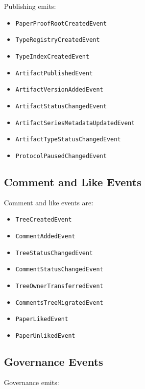\documentclass[11pt]{article}
\newcommand{\code}[1]{\texttt{#1}}
\begin{document}
Publishing emits:

\begin{itemize}[leftmargin=*]
  \item \code{PaperProofRootCreatedEvent}
  \item \code{TypeRegistryCreatedEvent}
  \item \code{TypeIndexCreatedEvent}
  \item \code{ArtifactPublishedEvent}
  \item \code{ArtifactVersionAddedEvent}
  \item \code{ArtifactStatusChangedEvent}
  \item \code{ArtifactSeriesMetadataUpdatedEvent}
  \item \code{ArtifactTypeStatusChangedEvent}
  \item \code{ProtocolPausedChangedEvent}
\end{itemize}

\subsection{Comment and Like Events}

Comment and like events are:

\begin{itemize}[leftmargin=*]
  \item \code{TreeCreatedEvent}
  \item \code{CommentAddedEvent}
  \item \code{TreeStatusChangedEvent}
  \item \code{CommentStatusChangedEvent}
  \item \code{TreeOwnerTransferredEvent}
  \item \code{CommentsTreeMigratedEvent}
  \item \code{PaperLikedEvent}
  \item \code{PaperUnlikedEvent}
\end{itemize}

\subsection{Governance Events}

Governance emits:
\end{document}

